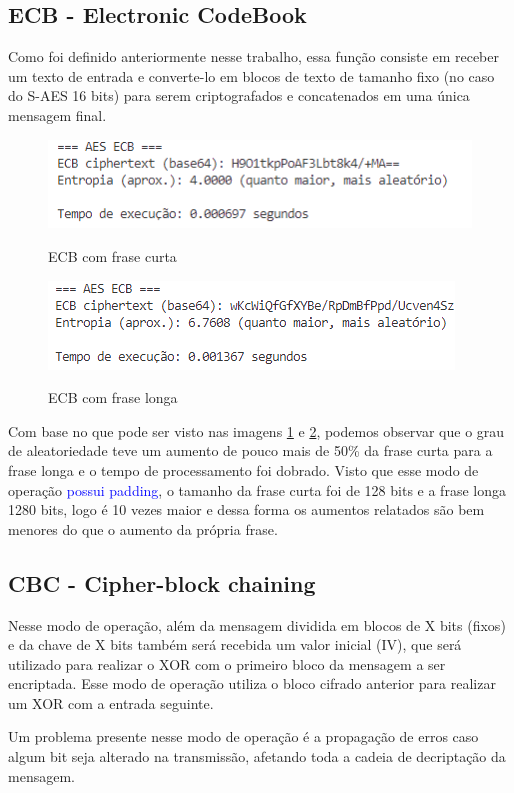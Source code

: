 \documentclass[12pt]{article}
\newcommand{\blue}[1]{\textcolor{blue}{#1}}
\begin{document}
\subsection{ECB - Electronic CodeBook}
Como foi definido anteriormente nesse trabalho, essa função consiste em receber um texto de entrada e converte-lo em blocos de texto de tamanho fixo (no caso do S-AES 16 bits) para serem criptografados e concatenados em uma única mensagem final.

\begin{figure}[h]
    \caption{ECB com frase curta}
    \centering
    \includegraphics[width = 0.5\linewidth]{Imagens/ECB-curto.png}  
    \label{fig:ECB Curto}
\end{figure}

\begin{figure}[h]
    \caption{ECB com frase longa}
    \centering
    \includegraphics[width = 0.5\linewidth]{Imagens/ECB-longo.png}  
    \label{fig:ECB Longo}
\end{figure}

Com base no que pode ser visto nas imagens \ref{fig:ECB Curto} e \ref{fig:ECB Longo}, podemos observar que o grau de aleatoriedade teve um aumento de pouco mais de 50\% da frase curta para a frase longa e o tempo de processamento foi dobrado. Visto que esse modo de operação \blue{possui padding}, o tamanho da frase curta foi de 128 bits e a frase longa 1280 bits, logo é 10 vezes maior e dessa forma os aumentos relatados são bem menores do que o aumento da própria frase.

\subsection{CBC - Cipher-block chaining}
Nesse modo de operação, além da mensagem dividida em blocos de X bits (fixos) e da chave de X bits também será recebida um valor inicial (IV), que será utilizado para realizar o XOR com o primeiro bloco da mensagem a ser encriptada. Esse modo de operação utiliza o bloco cifrado anterior para realizar um XOR com a entrada seguinte.

Um problema presente nesse modo de operação é a propagação de erros caso algum bit seja alterado na transmissão, afetando toda a cadeia de decriptação da mensagem.
\end{document}
